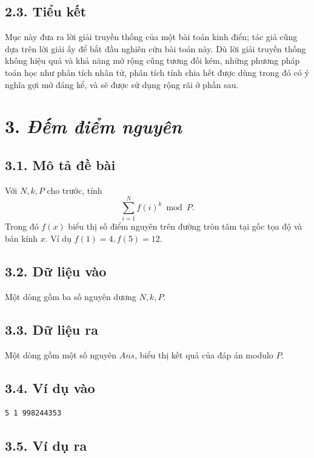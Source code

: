 \documentclass[11pt]{article}
\begin{document}
\subsection*{2.3. Tiểu kết}

Mục này đưa ra lời giải truyền thống của một bài toán kinh điển; tác giả cũng
dựa trên lời giải ấy để bắt đầu nghiên cứu bài toán này. Dù lời giải truyền
thống không hiệu quả và khả năng mở rộng cũng tương đối kém, những phương pháp
toán học như phân tích nhân tử, phân tích tính chia hết được dùng trong đó có
ý nghĩa gợi mở đáng kể, và sẽ được sử dụng rộng rãi ở phần sau.

\section*{3. \emph{Đếm điểm nguyên}}

\subsection*{3.1. Mô tả đề bài}

Với \(N,k,P\) cho trước, tính
\[
  \sum_{i=1}^{N} f(i)^k \bmod P.
\]
Trong đó \(f(x)\) biểu thị số điểm nguyên trên đường tròn tâm tại gốc tọa độ
và bán kính \(x\). Ví dụ \(f(1)=4, f(5)=12\).

\subsection*{3.2. Dữ liệu vào}

Một dòng gồm ba số nguyên dương \(N,k,P\).

\subsection*{3.3. Dữ liệu ra}

Một dòng gồm một số nguyên \(Ans\), biểu thị kết quả của đáp án modulo \(P\).

\subsection*{3.4. Ví dụ vào}

\begin{verbatim}
5 1 998244353
\end{verbatim}

\subsection*{3.5. Ví dụ ra}
\end{document}
